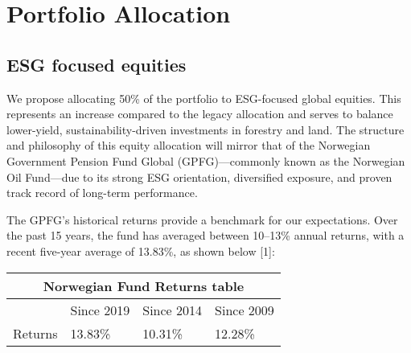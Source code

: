 





\section{Portfolio Allocation}
\subsection{ESG focused equities}
\par We propose allocating 50\% of the portfolio to ESG-focused global equities. This represents an increase compared to the legacy allocation and serves to balance lower-yield, sustainability-driven investments in forestry and land. The structure and philosophy of this equity allocation will mirror that of the Norwegian Government Pension Fund Global (GPFG)—commonly known as the Norwegian Oil Fund—due to its strong ESG orientation, diversified exposure, and proven track record of long-term performance.
\par The GPFG’s historical returns provide a benchmark for our expectations. Over the past 15 years, the fund has averaged between 10–13\% annual returns, with a recent five-year average of 13.83\%, as shown below [1]:\\
\bigskip
\begin{center}
    

\begin{tabular}{ |p{3cm}||p{3cm}|p{3cm}|p{3cm}|  }
 \hline
 \multicolumn{4}{|c|}{Norwegian Fund Returns table} \\
 \hline
  & Since 2019 & Since 2014 & Since 2009\\
 \hline
 Returns   & 13.83\%    &10.31\%&  12.28\%\\
 
 \hline
\end{tabular}
\end{center}
\bigskip

